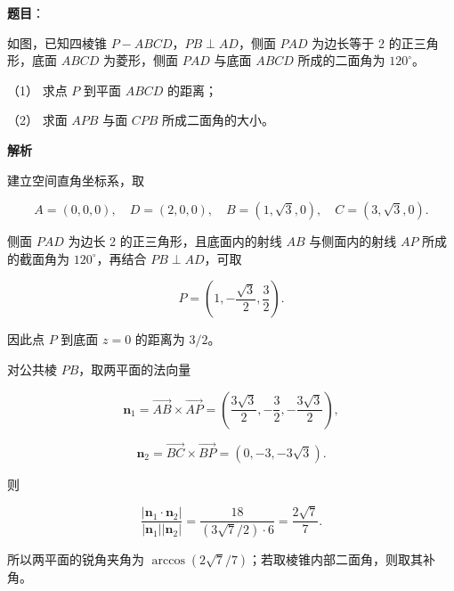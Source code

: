 \begin{answer}

\textbf{题目}：

如图，已知四棱锥 $P-ABCD$，$PB\perp AD$，侧面 $PAD$ 为边长等于 2 的正三角形，底面 $ABCD$ 为菱形，侧面 $PAD$ 与底面 $ABCD$ 所成的二面角为 $120^\circ$。
\nopagebreak[4]
\begin{center}\end{center}
\nopagebreak[4]
（1） 求点 $P$ 到平面 $ABCD$ 的距离；

（2） 求面 $APB$ 与面 $CPB$ 所成二面角的大小。

\textbf{解析}


建立空间直角坐标系，取

\nopagebreak[4]
\[
A=(0,0,0),\quad D=(2,0,0),\quad B=(1,\sqrt3,0),\quad C=(3,\sqrt3,0).
\]

侧面 $PAD$ 为边长 2 的正三角形，且底面内的射线 $AB$ 与侧面内的射线 $AP$ 所成的截面角为 $120^\circ$，再结合 $PB\perp AD$，可取

\nopagebreak[4]
\[
P=\left(1,-\frac{\sqrt3}{2},\frac32\right).
\]

因此点 $P$ 到底面 $z=0$ 的距离为 $3/2$。


对公共棱 $PB$，取两平面的法向量

\nopagebreak[4]
\[
\boldsymbol n_1=\overrightarrow{AB}\times\overrightarrow{AP}
=\left(\frac{3\sqrt3}{2},-\frac32,-\frac{3\sqrt3}{2}\right),
\]

\nopagebreak[4]
\[
\boldsymbol n_2=\overrightarrow{BC}\times\overrightarrow{BP}
=(0,-3,-3\sqrt3).
\]

则

\nopagebreak[4]
\[
\frac{|\boldsymbol n_1\cdot\boldsymbol n_2|}
{|\boldsymbol n_1||\boldsymbol n_2|}
=\frac{18}{(3\sqrt7/2)\cdot6}
=\frac{2\sqrt7}{7}.
\]

所以两平面的锐角夹角为 $\arccos(2\sqrt7/7)$；若取棱锥内部二面角，则取其补角。



\end{answer}
